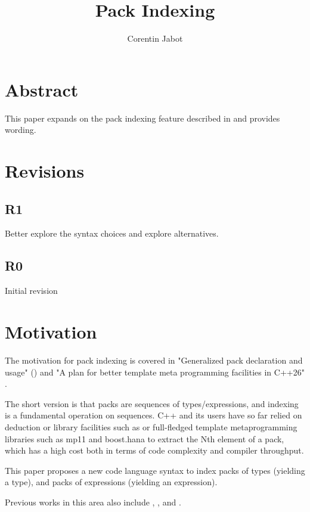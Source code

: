 \documentclass{wg21}
\title{Pack Indexing}
\author{Corentin Jabot}{corentin.jabot@gmail.com}
\begin{document}
\maketitle

\section{Abstract}

This paper expands on the pack indexing feature described in  and provides wording.

\section{Revisions}


\subsection{R1}

Better explore the syntax choices and explore alternatives.

\subsection{R0}

Initial revision

\section{Motivation}

The motivation for pack indexing is covered in "Generalized pack declaration and usage" () and
"A plan for better template meta programming facilities in C++26" \cite{P2632R0}.

The short version is that packs are sequences of types/expressions, and indexing is a fundamental operation on sequences.
C++ and its users have so far relied on deduction or library facilities such as  or full-fledged template metaprogramming libraries such as
mp11 and boost.hana to extract the Nth element of a pack, which has a high cost both in terms of code complexity and compiler throughput.

This paper proposes a new code language syntax to index packs of types (yielding a type), and packs of expressions (yielding an expression).

Previous works in this area also include , ,  and .
\end{document}
